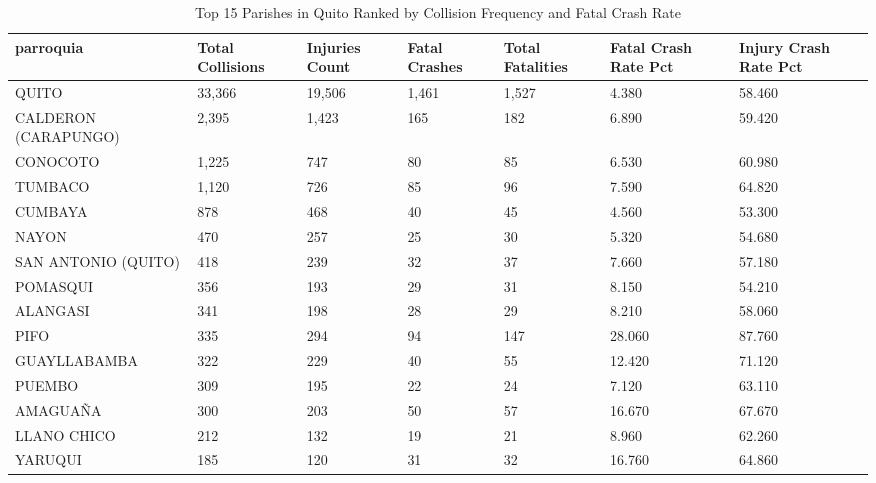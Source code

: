 \begin{table}[htbp]
\centering
\caption{Top 15 Parishes in Quito Ranked by Collision Frequency and Fatal Crash Rate}
\label{tab:parish_risk}
\begin{tabular}{lllllll}
\toprule
\textbf{parroquia} & \textbf{Total Collisions} & \textbf{Injuries Count} & \textbf{Fatal Crashes} & \textbf{Total Fatalities} & \textbf{Fatal Crash Rate Pct} & \textbf{Injury Crash Rate Pct} \\
\midrule
QUITO & 33,366 & 19,506 & 1,461 & 1,527 & 4.380 & 58.460 \\
CALDERON (CARAPUNGO) & 2,395 & 1,423 & 165 & 182 & 6.890 & 59.420 \\
CONOCOTO & 1,225 & 747 & 80 & 85 & 6.530 & 60.980 \\
TUMBACO & 1,120 & 726 & 85 & 96 & 7.590 & 64.820 \\
CUMBAYA & 878 & 468 & 40 & 45 & 4.560 & 53.300 \\
NAYON & 470 & 257 & 25 & 30 & 5.320 & 54.680 \\
SAN ANTONIO (QUITO) & 418 & 239 & 32 & 37 & 7.660 & 57.180 \\
POMASQUI & 356 & 193 & 29 & 31 & 8.150 & 54.210 \\
ALANGASI & 341 & 198 & 28 & 29 & 8.210 & 58.060 \\
PIFO & 335 & 294 & 94 & 147 & 28.060 & 87.760 \\
GUAYLLABAMBA & 322 & 229 & 40 & 55 & 12.420 & 71.120 \\
PUEMBO & 309 & 195 & 22 & 24 & 7.120 & 63.110 \\
AMAGUAÑA & 300 & 203 & 50 & 57 & 16.670 & 67.670 \\
LLANO CHICO & 212 & 132 & 19 & 21 & 8.960 & 62.260 \\
YARUQUI & 185 & 120 & 31 & 32 & 16.760 & 64.860 \\
\bottomrule
\end{tabular}
\end{table}